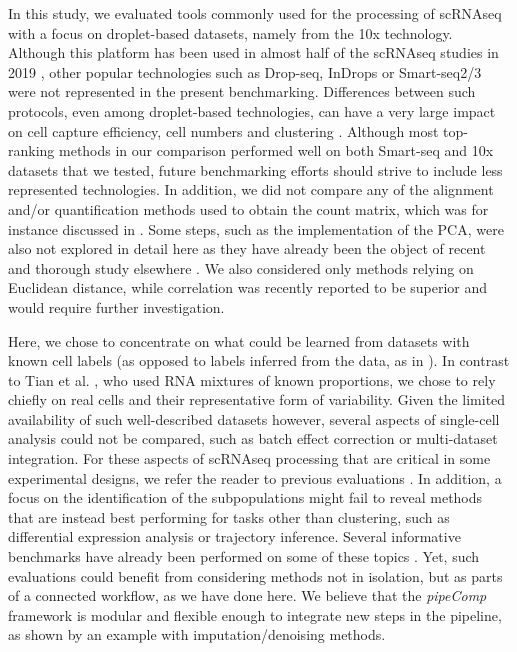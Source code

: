 \documentclass{bmcart}
\begin{document}
In this study, we evaluated tools commonly used for the processing of scRNAseq with a focus on droplet-based datasets, namely from the 10x technology. Although this platform has been used in almost half of the scRNAseq studies in 2019 \citep{SvenssonDB2019}, other popular technologies such as Drop-seq, InDrops or Smart-seq2/3 were not represented in the present benchmarking. Differences between such protocols, even among droplet-based technologies, can have a very large impact on cell capture efficiency, cell numbers and clustering \citealp{MereuCellAtlas2019, ZhangDroplet2019, SalomonDroplet2019}. Although most top-ranking methods in our comparison performed well on both Smart-seq and 10x datasets that we tested, future benchmarking efforts should strive to include less represented technologies. In addition, we did not compare any of the alignment and/or quantification methods used to obtain the count matrix, which was for instance discussed in \citep{viethSystematic2019}. Some steps, such as the implementation of the PCA, were also not explored in detail here as they have already been the object of recent and thorough study elsewhere \citep{SunDimRed2019, TsuyuzakiPCA2020}. We also considered only methods relying on Euclidean distance, while correlation was recently reported to be superior\citep{kim_impact_2019} and would require further investigation.

Here, we chose to concentrate on what could be learned from datasets with known cell labels (as opposed to labels inferred from the data, as in \citep{MereuCellAtlas2019}). In contrast to Tian et al. \citep{tianMixology2018}, who used RNA mixtures of known proportions, we chose to rely chiefly on real cells and their representative form of variability. Given the limited availability of such well-described datasets however, several aspects of single-cell analysis could not be compared, such as batch effect correction or multi-dataset integration. For these aspects of scRNAseq processing that are critical in some experimental designs, we refer the reader to previous evaluations \citealp{TranBatch2020, StuartIntegration2019}. In addition, a focus on the identification of the subpopulations might fail to reveal methods that are instead best performing for tasks other than clustering, such as differential expression analysis or trajectory inference. Several informative benchmarks have already been performed on some of these topics \citealp{CrowellMuscat2019, DalMolinDE2017, JaakkolaDE2017, SaelensTraject2019, SonesonDE2018, WangDE2019}. Yet, such evaluations could benefit from considering methods not in isolation, but as parts of a connected workflow, as we have done here. We believe that the \textit{pipeComp} framework is modular and flexible enough to integrate new steps in the pipeline, as shown by an example with imputation/denoising methods.
\end{document}

